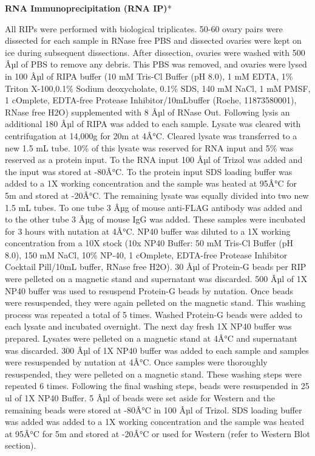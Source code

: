 \documentclass[12pt,oneside]{reedthesis}
\begin{document}
\textbf{RNA Immunoprecipitation (RNA IP)}*

All RIPs were performed with biological triplicates. 50-60 ovary pairs were dissected for each sample in RNase free PBS and dissected ovaries were kept on ice during subsequent dissections. After dissection, ovaries were washed with 500 Âµl of PBS to remove any debris. This PBS was removed, and ovaries were lysed in 100 Âµl of RIPA buffer (10 mM Tris-Cl Buffer (pH 8.0), 1 mM EDTA, 1\% Triton X-100,0.1\% Sodium deoxycholate, 0.1\% SDS, 140 mM NaCl, 1 mM PMSF, 1 cOmplete, EDTA-free Protease Inhibitor/10mLbuffer (Roche, 11873580001), RNase free H2O) supplemented with 8 Âµl of RNase Out. Following lysis an additional 180 Âµl of RIPA was added to each sample. Lysate was cleared with centrifugation at 14,000g for 20m at 4Â°C. Cleared lysate was transferred to a new 1.5 mL tube. 10\% of this lysate was reserved for RNA input and 5\% was reserved as a protein input. To the RNA input 100 Âµl of Trizol was added and the input was stored at -80Â°C. To the protein input SDS loading buffer was added to a 1X working concentration and the sample was heated at 95Â°C for 5m and stored at -20Â°C. The remaining lysate was equally divided into two new 1.5 mL tubes. To one tube 3 Âµg of mouse anti-FLAG antibody was added and to the other tube 3 Âµg of mouse IgG was added. These samples were incubated for 3 hours with nutation at 4Â°C. NP40 buffer was diluted to a 1X working concentration from a 10X stock (10x NP40 Buffer: 50 mM Tris-Cl Buffer (pH 8.0), 150 mM NaCl, 10\% NP-40, 1 cOmplete, EDTA-free Protease Inhibitor Cocktail Pill/10mL buffer, RNase free H2O). 30 Âµl of Protein-G beads per RIP were pelleted on a magnetic stand and supernatant was discarded. 500 Âµl of 1X NP40 buffer was used to resuspend Protein-G beads by nutation. Once beads were resuspended, they were again pelleted on the magnetic stand. This washing process was repeated a total of 5 times. Washed Protein-G beads were added to each lysate and incubated overnight. The next day fresh 1X NP40 buffer was prepared. Lysates were pelleted on a magnetic stand at 4Â°C and supernatant was discarded. 300 Âµl of 1X NP40 buffer was added to each sample and samples were resuspended by nutation at 4Â°C. Once samples were thoroughly resuspended, they were pelleted on a magnetic stand. These washing steps were repeated 6 times. Following the final washing steps, beads were resuspended in 25 ul of 1X NP40 Buffer. 5 Âµl of beads were set aside for Western and the remaining beads were stored at -80Â°C in 100 Âµl of Trizol. SDS loading buffer was added was added to a 1X working concentration and the sample was heated at 95Â°C for 5m and stored at -20Â°C or used for Western (refer to Western Blot section).
\end{document}
